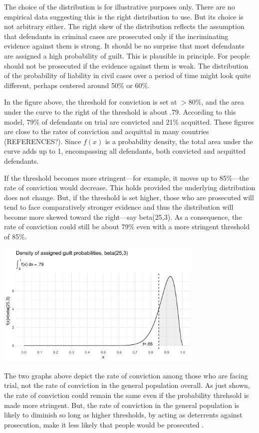 \documentclass[
  10pt,
  dvipsnames,enabledeprecatedfontcommands]{scrartcl}
\begin{document}
The choice of the distribution is for illustrative purposes only. There
are no empirical data suggesting this is the right distribution to use.
But its choice is not arbitrary either. The right skew of the
distribution reflects the assumption that defendants in criminal cases
are prosecuted only if the incriminating evidence against them is
strong. It should be no surprise that most defendants are assigned a
high probability of guilt. This is plausible in principle. For people
should not be prosecuted if the evidence against them is weak. The
distribution of the probability of liability in civil cases over a
period of time might look quite different, perhaps centered around 50\%
or 60\%.

In the figure above, the threshold for conviction is set at \(>80\%\),
and the area under the curve to the right of the threshold is about
\(.79\). According to this model, 79\% of defendants on trial are
convicted and 21\% acquitted. These figures are close to the rates of
conviction and acquittal in many countries (REFERENCES?). Since \(f(x)\)
is a probability density, the total area under the curve adds up to 1,
encompassing all defendants, both convicted and acquitted defendants.

If the threshold becomes more stringent---for example, it moves up to
85\%---the rate of conviction would decrease. This holds provided the
underlying distribution does not change. But, if the threshold is set
higher, those who are prosecuted will tend to face comparatively
stronger evidence and thus the distribution will become more skewed
toward the right---say \textsf{beta(25,3)}. As a consequence, the rate
of conviction could still be about 79\% even with a more stringent
threshold of 85\%.

\begin{center}
    \includegraphics[width=10cm]{dbeta(25,3)2.png}
\end{center}

The two graphs above depict the rate of conviction among those who are
facing trial, not the rate of conviction in the general population
overall. As just shown, the rate of conviction could remain the same
even if the probability threhsold is made more stringent. But, the rate
of conviction in the general population is likely to diminish so long as
higher thresholds, by acting as deterrents against prosecution, make it
less likely that people would be prosecuted .
\end{document}
